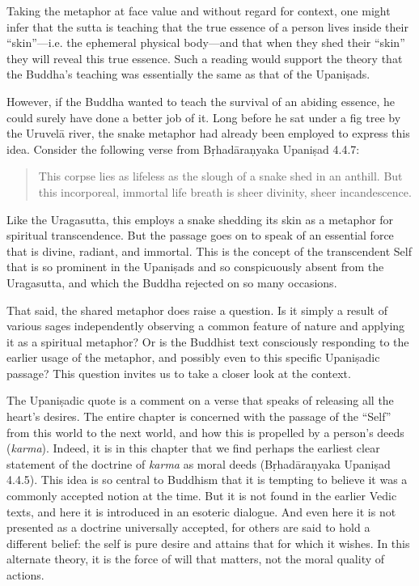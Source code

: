 \documentclass[12pt,openany]{book}%
\begin{document}
Taking the metaphor at face value and without regard for context, one might infer that the sutta is teaching that the true essence of a person lives inside their “skin”—i.e. the ephemeral physical body—and that when they shed their “skin” they will reveal this true essence. Such a reading would support the theory that the Buddha’s teaching was essentially the same as that of the \textsanskrit{Upaniṣads}.

However, if the Buddha wanted to teach the survival of an abiding essence, he could surely have done a better job of it. Long before he sat under a fig tree by the \textsanskrit{Uruvelā} river, the snake metaphor had already been employed to express this idea. Consider the following verse from \textsanskrit{Bṛhadāraṇyaka} \textsanskrit{Upaniṣad} 4.4.7:

\begin{quotation}%
This corpse lies as lifeless as the slough of a snake shed in an anthill. But this incorporeal, immortal life breath is sheer divinity, sheer incandescence.

%
\end{quotation}

Like the Uragasutta, this employs a snake shedding its skin as a metaphor for spiritual transcendence. But the passage goes on to speak of an essential force that is divine, radiant, and immortal. This is the concept of the transcendent Self that is so prominent in the \textsanskrit{Upaniṣads} and so conspicuously absent from the Uragasutta, and which the Buddha rejected on so many occasions.

That said, the shared metaphor does raise a question. Is it simply a result of various sages independently observing a common feature of nature and applying it as a spiritual metaphor? Or is the Buddhist text consciously responding to the earlier usage of the metaphor, and possibly even to this specific \textsanskrit{Upaniṣadic} passage? This question invites us to take a closer look at the context.

The \textsanskrit{Upaniṣadic} quote is a comment on a verse that speaks of releasing all the heart’s desires. The entire chapter is concerned with the passage of the “Self” from this world to the next world, and how this is propelled by a person’s deeds (\textit{karma}). Indeed, it is in this chapter that we find perhaps the earliest clear statement of the doctrine of \textit{karma} as moral deeds (\textsanskrit{Bṛhadāraṇyaka} \textsanskrit{Upaniṣad} 4.4.5). This idea is so central to Buddhism that it is tempting to believe it was a commonly accepted notion at the time. But it is not found in the earlier Vedic texts, and here it is introduced in an esoteric dialogue. And even here it is not presented as a doctrine universally accepted, for others are said to hold a different belief: the self is pure desire and attains that for which it wishes. In this alternate theory, it is the force of will that matters, not the moral quality of actions.
\end{document}
